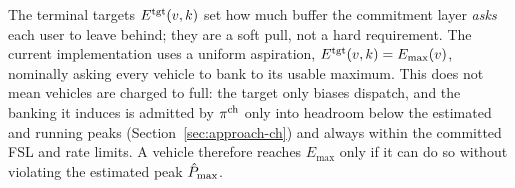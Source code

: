
The terminal targets $E^{\mathrm{tgt}}(v,k)$ set how much buffer the commitment layer \emph{asks} each user to leave behind; they are a soft pull, not a hard requirement. The current implementation uses a uniform aspiration, $E^{\mathrm{tgt}}(v,k) = E_{\max}(v)$, nominally asking every vehicle to bank to its usable maximum. This does not mean vehicles are charged to full: the target only biases dispatch, and the banking it induces is admitted by $\pi^{\mathrm{ch}}$ only into headroom below the estimated and running peaks (Section~\ref{sec:approach-ch}) and always within the committed FSL and rate limits. A vehicle therefore reaches $E_{\max}$ only if it can do so without violating the estimated peak $\hat{P}_{\max}$. 



